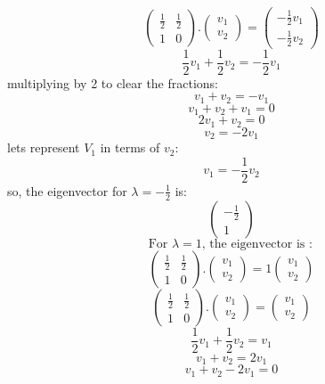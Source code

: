 \documentclass[a3paper,12pt]{extarticle} %
\begin{document}
\begin{enumerate}
\begin{enumerate}
\[        \]
        \[
            \begin{pmatrix} \frac{1}{2} & \frac{1}{2} \\ 1 & 0 \end{pmatrix}. \begin{pmatrix} v_1 \\ v_2 \end{pmatrix} = \begin{pmatrix} -\frac{1}{2}v_1 \\ -\frac{1}{2}v_2 \end{pmatrix}
        \]
        \[
            \frac{1}{2}v_1 + \frac{1}{2}v_2 = -\frac{1}{2}v_1
        \]
        multiplying by 2 to clear the fractions:
        \[
            v_1 + v_2 = -v_1
        \]
        \[
            v_1 + v_2 + v_1 = 0
        \]
        \[
            2v_1 + v_2 = 0
        \]
        \[
            v_2 = -2v_1
        \]
        lets represent \(V_1\) in terms of \(v_2\):
        \[
            v_1 = -\frac{1}{2}v_2
        \]
        so, the eigenvector for \(\lambda = -\frac{1}{2}\) is:
        \[
            \begin{pmatrix} -\frac{1}{2} \\ 1 \end{pmatrix}
        \]
        \[
            \text{For } \lambda = 1 \text{, the eigenvector is }:
        \]
        \[
            \begin{pmatrix} \frac{1}{2} & \frac{1}{2} \\ 1 & 0 \end{pmatrix}. \begin{pmatrix} v_1 \\ v_2 \end{pmatrix} = 1 \begin{pmatrix} v_1 \\ v_2 \end{pmatrix}
        \]
        \[
            \begin{pmatrix} \frac{1}{2} & \frac{1}{2} \\ 1 & 0 \end{pmatrix}. \begin{pmatrix} v_1 \\ v_2 \end{pmatrix} = \begin{pmatrix} v_1 \\ v_2 \end{pmatrix}
        \]
        \[
            \frac{1}{2}v_1 + \frac{1}{2}v_2 = v_1
        \]
        \[
            v_1 + v_2 = 2v_1
        \]
        \[
            v_1 + v_2 - 2v_1 = 0
\]
\end{enumerate}
\end{enumerate}
\end{document}
